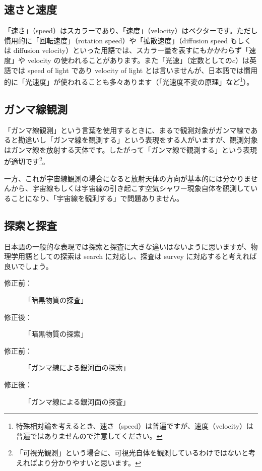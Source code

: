 \subsection{速さと速度}

「速さ」（speed）はスカラーであり、「速度」（velocity）はベクターです。ただし慣用的に「回転速度」（rotation speed）や「拡散速度」（diffusion speed もしくは diffusion velocity）といった用語では、スカラー量を表すにもかかわらず「速度」や velocity の使われることがあります。また「光速」（定数としての$c$）は英語では speed of light であり velocity of light とは言いませんが、日本語では慣用的に「光速度」が使われることも多々あります（「光速度不変の原理」など\footnote{特殊相対論を考えるとき、速さ（speed）は普遍ですが、速度（velocity）は普遍ではありませんので注意してください。}）。

\subsection{ガンマ線観測}

「ガンマ線観測」という言葉を使用するときに、まるで観測対象がガンマ線であると勘違いし「ガンマ線を観測する」という表現をする人がいますが、観測対象はガンマ線を放射する天体です。したがって「ガンマ線で観測する」という表現が適切です\footnote{「可視光観測」という場合に、可視光自体を観測しているわけではないと考えればより分かりやすいと思います。}。

一方、これが宇宙線観測の場合になると放射天体の方向が基本的には分かりませんから、宇宙線もしくは宇宙線の引き起こす空気シャワー現象自体を観測していることになり、「宇宙線を観測する」で問題ありません。

\subsection{探索と探査}

日本語の一般的な表現では探索と探査に大きな違いはないように思いますが、物理学用語としての探索は search に対応し、探査は survey に対応すると考えれば良いでしょう。

\begin{description}
\item[修正前：]「暗黒物質の探査」
\item[修正後：]「暗黒物質の探索」
\end{description}

\begin{description}
\item[修正前：]「ガンマ線による銀河面の探索」
\item[修正後：]「ガンマ線による銀河面の探査」
\end{description}

